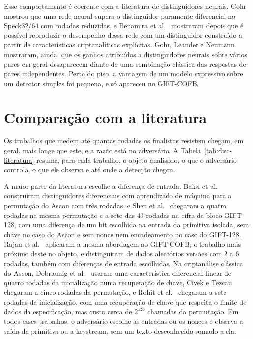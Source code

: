 Esse comportamento é coerente com a literatura de distinguidores neurais. Gohr~\cite{gohr_2019} mostrou que uma rede neural supera o distinguidor puramente diferencial no Speck32/64 com rodadas reduzidas, e Benamira et al.~\cite{benamira_2021} mostraram depois que é possível reproduzir o desempenho dessa rede com um distinguidor construído a partir de características criptanalíticas explícitas. Gohr, Leander e Neumann~\cite{GohrLeanderNeumann2022} mostraram, ainda, que os ganhos atribuídos a distinguidores neurais sobre vários pares em geral desaparecem diante de uma combinação clássica das respostas de pares independentes. Perto do piso, a vantagem de um modelo expressivo sobre um detector simples foi pequena, e só apareceu no GIFT-COFB.


\section{Comparação com a literatura}
\label{sec:disc-literatura}

Os trabalhos que medem até quantas rodadas os finalistas resistem chegam, em geral, mais longe que este, e a razão está no adversário. A Tabela~\ref{tab:disc-literatura} resume, para cada trabalho, o objeto analisado, o que o adversário controla, o que ele observa e até onde a detecção chegou.

A maior parte da literatura escolhe a diferença de entrada. Baksi et al.~\cite{Baksi2021} construíram distinguidores diferenciais com aprendizado de máquina para a permutação do Ascon com três rodadas, e Shen et al.~\cite{Shen2024ND} chegaram a quatro rodadas na mesma permutação e a sete das 40 rodadas na cifra de bloco GIFT-128, com uma diferença de um bit escolhida na entrada da primitiva isolada, sem chave no caso do Ascon e sem nonce nem encadeamento no caso do GIFT-128. Rajan et al.~\cite{Rajan2022} aplicaram a mesma abordagem ao GIFT-COFB, o trabalho mais próximo deste no objeto, e distinguiram de dados aleatórios versões com 2 a 6 rodadas, também com diferenças de entrada escolhidas. Na criptanálise clássica do Ascon, Dobraunig et al.~\cite{Dobraunig2021AsconSecurity} usaram uma característica diferencial-linear de quatro rodadas da inicialização numa recuperação de chave, Civek e Tezcan~\cite{CivekTezcan2022} chegaram a cinco rodadas da permutação, e Rohit et al.~\cite{Rohit2021Ascon} chegaram a sete rodadas da inicialização, com uma recuperação de chave que respeita o limite de dados da especificação, mas custa cerca de $2^{123}$ chamadas da permutação. Em todos esses trabalhos, o adversário escolhe as entradas ou os nonces e observa a saída da primitiva ou a keystream, sem um texto desconhecido somado a ela.

